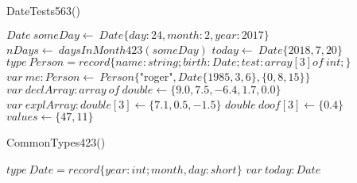 \documentclass[a4paper,10pt]{article}
\begin{document}
\STATE {}


\begin{algorithm}
\caption{DateTests563()}
\begin{algorithmic}[5]

  \STATE \(Date\ someDay\gets\ Date\{day:24,month:2,year:2017\}\)
  \STATE \(nDays\gets\ daysInMonth423(someDay)\)
  \STATE \(today\gets\ Date\{2018,7,20\}\)
  \STATE \(type\ Person=record\{name:string;birth:Date;test:array[3]of\ int;\}\)
  \STATE \(var\ me:Person\gets\ Person\{\)"{}roger"{}\(,Date\{1985,3,6\},\{0,8,15\}\}\)
  \STATE \(var\ declArray:array\ of\ double\gets\{9.0,7.5,-6.4,1.7,0.0\}\)
  \STATE \(var\ explArray:double[3]\gets\{7.1,0.5,-1.5\}\)
  \STATE \(double\ doof[3]\gets\{0.4\}\)
  \STATE \(values\gets\{47,11\}\)

\end{algorithmic}
\end{algorithm}


\begin{algorithm}
\caption{CommonTypes423()}
\begin{algorithmic}[5]

\STATE {}
  \STATE \(type\ Date=record\{year:int;month,day:short\}\)
  \STATE \(var\ today:Date\)

\end{algorithmic}
\end{algorithm}
\end{document}
